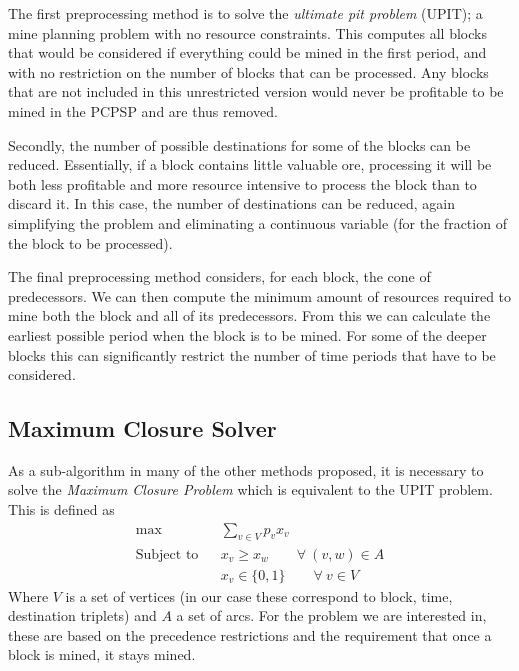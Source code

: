\documentclass[authoryear,11pt,square,number,times,super,comma]{elsarticle}
\begin{document}
The first preprocessing method is to solve the {\it ultimate pit problem} (UPIT); a mine planning problem with no resource constraints. This computes all
blocks that would be considered if everything could be mined in the first period, and
with no restriction on the number of blocks that can be processed. Any blocks that
are not included in this unrestricted version would never be profitable to be
mined in the PCPSP and are thus removed.

Secondly, the number of possible destinations for some of the blocks can be
reduced. Essentially, if a block contains little valuable ore,
processing it will be both less profitable and more resource intensive to
process the block than to discard it. In this case, the number of destinations
can be reduced, again simplifying the problem and eliminating a continuous
variable (for the fraction of the block to be processed).

The final preprocessing method considers, for each block, the cone of
predecessors. We can then compute the minimum amount of resources required to
mine both the block and all of its predecessors. From this we can calculate the
earliest possible period when the block is to be mined. For some of the deeper
blocks this can significantly restrict the number of time periods that have to
be considered. 

\subsection{Maximum Closure Solver}\label{sec:MC}
As a sub-algorithm in many of the other methods proposed, it is necessary to solve the {\em Maximum Closure Problem} which is equivalent to the UPIT problem. This is defined as 
\begin{eqnarray}
 \max && \sum_{v\in V} p_v x_v  \label{eq:MC:obj}\\
 \text{Subject to}&& x_v \ge x_w \qquad\forall\ (v,w)\in A\\
 &&x_v\in \{0,1\} \qquad\forall\ v\in V\label{eq:MC:bounds}
\end{eqnarray}
Where $V$ is a set of vertices (in our case these correspond to block, time, destination triplets) and $A$ a set of arcs. For the problem we are 
interested in, these are based on the precedence restrictions and the requirement that once a block is mined, it stays mined. 
\end{document}
